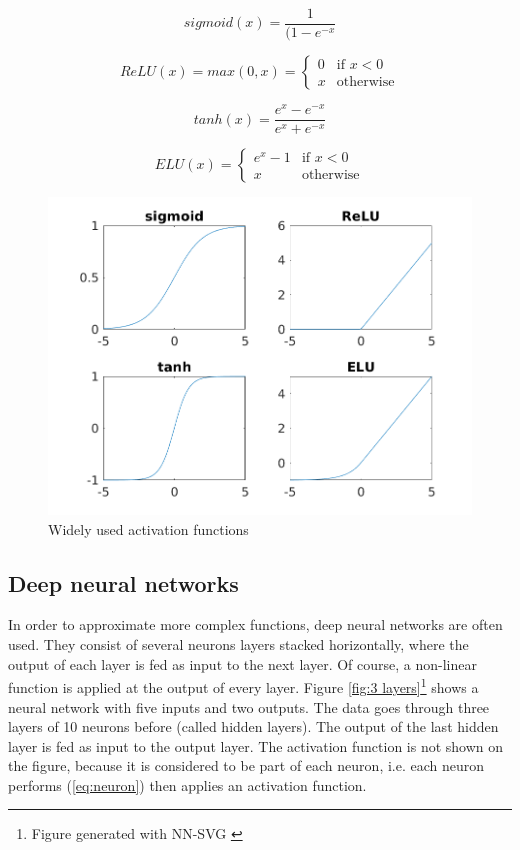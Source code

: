 \begin{equation} \label{eq:sigmoid}
    sigmoid(x) = \frac{1}{(1-e^{-x}}
\end{equation}

\begin{equation} \label{eq:relu}
    ReLU(x) = max(0,x) = 
            \begin{cases}
                0 & \text{if $x<0$} \\
                x & \text{otherwise} 
            \end{cases}
\end{equation}

\begin{equation} \label{eq:tanh}
    tanh(x) = \frac{e^x-e^{-x}}{e^x+e^{-x}}
\end{equation}

\begin{equation} \label{eq:elu}
    ELU(x) = 
    \begin{cases}
        e^x-1 & \text{if $x<0$}\\
        x & \text{otherwise}
    \end{cases}
\end{equation}

\begin{figure}[h!]
    \centering
    \includegraphics[width=.7\textwidth]{images/activation functions.png}
    \caption{Widely used activation functions}
    \label{fig:activation}
\end{figure}

\subsection{Deep neural networks}

In order to approximate more complex functions, deep neural networks are often used. They consist of several neurons layers stacked horizontally, where the output of each layer is fed as input to the next layer. Of course, a non-linear function is applied at the output of every layer. Figure \ref{fig:3 layers}\footnote{Figure generated with NN-SVG \cite{nnsvg}} shows a neural network with five inputs and two outputs. The data goes through three layers of 10 neurons before (called hidden layers). The output of the last hidden layer is fed as input to the output layer. The activation function is not shown on the figure, because it is considered to be part of each neuron, i.e. each neuron performs (\ref{eq:neuron}) then applies an activation function. 

